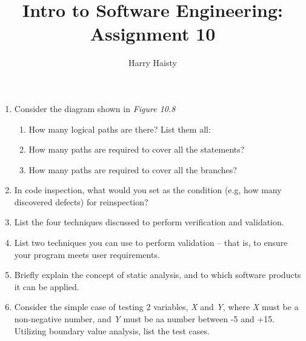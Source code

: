 \documentclass[11pt]{article}
\title{Intro to Software Engineering: Assignment 10}
\author{Harry Haisty}
\begin{document}
    \maketitle
    \begin{enumerate}
        \item Consider the diagram shown in \textit{Figure 10.8}
        \begin{enumerate}
        \item How many logical paths are there? List them all:
        
        \item How many paths are required to cover all the statements?
        
        \item How many paths are required to cover all the branches?
        \end{enumerate}
        
        \item In code inspection, what would you set as the condition (e.g, how many discovered defects) for reinspection?
        \newline
        \color{blue}{If the moderator deems that in the follow-up there are too many defects, they may call for a reinspection.}
        
        \color{black}
        
        \item List the four techniques discussed to perform verification and validation.
        
        
        \item List two techniques you can use to perform validation -- that is, to ensure your program meets user requirements. 
        
        \item Briefly explain the concept of static analysis, and to which software products it can be applied.
        
        \item Consider the simple case of testing 2 variables, \textit{X} and \textit{Y}, where \textit{X} must be a non-negative number, and \textit{Y} must be aa number between -5 and +15. Utilizing boundary value analysis, list the test cases. 
        

\end{enumerate}
\end{document}
